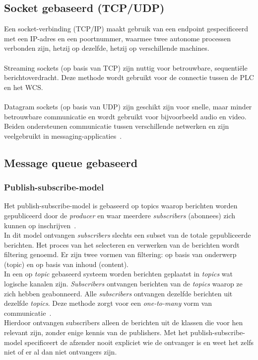 \subsection{Socket gebaseerd (TCP/UDP)}
Een socket-verbinding (TCP/IP) maakt gebruik van een endpoint gespecificeerd met een IP-adres en een poortnummer, 
waarmee twee autonome processen verbonden zijn, hetzij op dezelfde, hetzij op verschillende machines.
\\
\\
Streaming sockets (op basis van TCP) zijn nuttig voor betrouwbare, sequentiële berichtoverdracht.
Deze methode wordt gebruikt voor de connectie tussen de PLC en het WCS.
\\ 
\\
Datagram sockets (op basis van UDP) zijn geschikt zijn voor snelle, maar minder betrouwbare communicatie en wordt gebruikt voor bijvoorbeeld audio en video.
Beiden ondersteunen communicatie tussen verschillende netwerken en zijn veelgebruikt in messaging-applicaties~\autocite{Dinari2020}.

\subsection{Message queue gebaseerd}

\subsubsection{Publish-subscribe-model}
Het publish-subscribe-model is gebaseerd op topics waarop berichten worden gepubliceerd door de \emph{producer} 
en waar meerdere \emph{subscribers} (abonnees) zich kunnen op inschrijven~\autocite{Dinari2020}. 
\\
In dit model ontvangen \emph{subscribers} slechts een subset van de totale gepubliceerde berichten. 
Het proces van het selecteren en verwerken van de berichten wordt filtering genoemd. 
Er zijn twee vormen van filtering: op basis van onderwerp (topic) en op basis van inhoud (content).
\\
In een op \emph{topic} gebaseerd systeem worden berichten geplaatst in \emph{topics} wat logische kanalen zijn.
\emph{Subscribers} ontvangen berichten van de \emph{topics} waarop ze zich hebben geabonneerd.
Alle \emph{subscribers} ontvangen dezelfde berichten uit dezelfde \emph{topics}. 
Deze methode zorgt voor een \emph{one-to-many} vorm van communicatie~\autocite{Dinari2020}.
\\
Hierdoor ontvangen subscribers alleen de berichten uit de klassen die voor hen relevant zijn, zonder enige kennis van de publishers. 
Met het publish-subscribe-model specificeert de afzender nooit expliciet wie de ontvanger is en weet het zelfs niet of er al dan niet ontvangers zijn.

